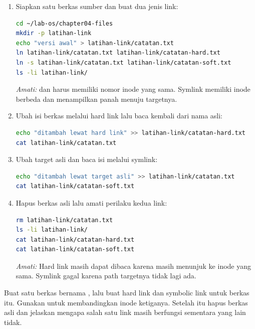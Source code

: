 \begin{enumerate}
    \item Siapkan satu berkas sumber dan buat dua jenis link:
\begin{lstlisting}[language=bash, caption={Membuat hard link dan symbolic link}]
cd ~/lab-os/chapter04-files
mkdir -p latihan-link
echo "versi awal" > latihan-link/catatan.txt
ln latihan-link/catatan.txt latihan-link/catatan-hard.txt
ln -s latihan-link/catatan.txt latihan-link/catatan-soft.txt
ls -li latihan-link/
\end{lstlisting}
    \textit{Amati:}  dan  harus memiliki nomor inode yang sama. Symlink memiliki inode berbeda dan menampilkan panah menuju targetnya.

    \item Ubah isi berkas melalui hard link lalu baca kembali dari nama asli:
\begin{lstlisting}[language=bash, caption={Mengubah isi melalui hard link}]
echo "ditambah lewat hard link" >> latihan-link/catatan-hard.txt
cat latihan-link/catatan.txt
\end{lstlisting}

    \item Ubah target asli dan baca isi melalui symlink:
\begin{lstlisting}[language=bash, caption={Membaca target melalui symbolic link}]
echo "ditambah lewat target asli" >> latihan-link/catatan.txt
cat latihan-link/catatan-soft.txt
\end{lstlisting}

    \item Hapus berkas asli lalu amati perilaku kedua link:
\begin{lstlisting}[language=bash, caption={Menghapus target asli}]
rm latihan-link/catatan.txt
ls -li latihan-link/
cat latihan-link/catatan-hard.txt
cat latihan-link/catatan-soft.txt
\end{lstlisting}
    \textit{Amati:} Hard link masih dapat dibaca karena masih menunjuk ke inode yang sama. Symlink gagal karena path targetnya tidak lagi ada.
\end{enumerate}

\begin{challengebox}
Buat satu berkas bernama , lalu buat hard link dan symbolic link untuk
berkas itu. Gunakan  untuk membandingkan inode ketiganya. Setelah itu hapus
berkas asli dan jelaskan mengapa salah satu link masih berfungsi sementara yang lain tidak.
\end{challengebox}

